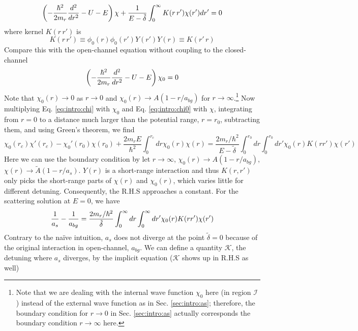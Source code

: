 \begin{equation}\label{eq:intro:chi}
\left(-\frac{\hbar^{2}}{2m_{r}}\frac{d^{2}}{dr^{2}}-U-E\right)\chi+\frac{1}{E-\tilde\delta}\int_{0}^{\infty}K(r\,r')\chi(r')dr'=0
\end{equation}
where kernel $K(r\,r')$ is
\begin{equation}\label{eq:intro:Krr}
K(r\,r')\equiv\phi_{0}(r)\phi_{0}(r')Y(r')Y(r)\equiv{}K(r'\,r)
\end{equation}
Compare this with the open-channel  \sch equation without coupling to the closed-channel
\begin{equation}\label{eq:intro:chi0}
\left(-\frac{\hbar^{2}}{2m_{r}}\frac{d^{2}}{dr^{2}}-U-E\right)\chi_{0}=0
\end{equation}
Note that $\chi_{0}(r)\rightarrow0$ as $r\rightarrow0$ and $\chi_{0}(r)\rightarrow{A}(1-r/a_{bg})$ for $r\rightarrow\infty$.\footnote{Note that we are dealing with the internal wave function $\chi_{0}$ here (in region $\mathcal{I}$) instead of the external wave function as in Sec. \ref{sec:intro:as}; therefore, the boundary condition for $r\rightarrow0$ in Sec. \ref{sec:intro:as} actually corresponds the boundary condition $r\rightarrow\infty$ here.} Now multiplying Eq. \ref{eq:intro:chi} with $\chi_{0}$ and Eq. \ref{eq:intro:chi0} with $\chi$, integrating from $r=0$ to a  distance much larger than the potential range, $r=r_{0}$, subtracting them, and using Green's theorem, we find 
\begin{equation}
\chi_{0}(r_{c})\chi'(r_{c})-\chi_{0}'(r_{0})\chi(r_{0})+\frac{2m_{r}E}{\hbar^{2}}\int_{0}^{r_{c}}dr\chi_{0}(r)\chi(r)
=\frac{2m_{r}/\hbar^{2}}{E-\tilde\delta}\int_{0}^{r_{0}}dr\int_{0}^{r_{0}}dr'\chi_{0}(r)K(rr')\chi(r')
\end{equation}
Here we can use the boundary condition by let $r\rightarrow\infty$, $\chi_{0}(r)\rightarrow{A}(1-r/a_{bg})$, $\chi(r)\rightarrow\tilde{A}(1-r/a_{s})$.  $Y(r)$ is a short-range interaction and thus $K(r,r')$ only picks the short-range parts of $\chi(r)$ and $\chi_{0}(r)$, which varies little for different detuning. Consequently,  the R.H.S approaches a constant.  For the scattering solution at  $E=0$, we have 
\begin{equation}
\frac{1}{a_{s}}-\frac{1}{a_{bg}}=\frac{2m_{r}/\hbar^{2}}{\tilde\delta}\int_{0}^{\infty}dr\int_{0}^{\infty}dr'\chi_{0}(r)K(rr')\chi(r')
\end{equation}
Contrary to the na\"ive intuition, $a_{s}$ does not diverge at the point $\tilde\delta=0$ because of the original interaction in open-channel, $a_{bg}$.  We can define a quantity $\mathcal{K}$, the detuning where $a_{s}$ diverges, by the implicit equation ($\mathcal{K}$ shows up in R.H.S as well)
